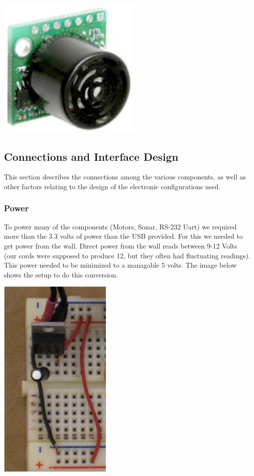   \begin{minipage}{6.5in}
    \includegraphics[width=70mm, height= 70mm]{imageSources/sonar.png}
  \centering
  \label{sonar}
\end{minipage}

\subsection{Connections and Interface Design}
This section describes the connections among the various components, as well as other factors relating to the design of the electronic configurations used.  

\subsubsection{Power}
To power many of the components (Motors, Sonar, RS-232 Uart) we required more than the 3.3 volts of power than the USB provided. For this we needed to get power from the wall. Direct power from the wall reads between 9-12 Volts (our cords were supposed to produce 12, but they often had fluctuating readings).  This power needed to be minimized to a managable 5 volts.  The image below shows the setup to do this conversion.

  \begin{minipage}{6.5in}
    \includegraphics[scale=0.75]{imageSources/power12to5.png}
  \centering
  \label{power12to5}
\end{minipage}

